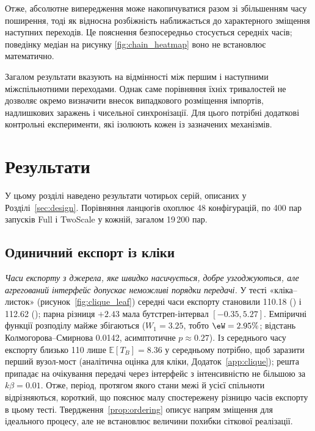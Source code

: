 Отже, абсолютне випередження
може накопичуватися разом
зі збільшенням часу поширення,
тоді як відносна розбіжність
наближається до характерного
зміщення наступних переходів.
Це пояснення безпосередньо
стосується середніх часів;
поведінку медіан на рисунку
\ref{fig:chain_heatmap} воно
не встановлює математично.

Загалом результати вказують
на відмінності між першим
і наступними міжспільнотними
переходами. Однак саме
порівняння їхніх тривалостей
не дозволяє окремо визначити
внесок випадкового розміщення
імпортів, надлишкових
заражень і чисельної
синхронізації.
Для цього потрібні додаткові
контрольні експерименти,
які ізолюють кожен
із зазначених механізмів.







\section{Результати}
\label{sec:results}

У цьому розділі наведено результати чотирьох серій, описаних у Розділі~\ref{sec:design}.
Порівняння ланцюгів охоплює 48 конфігурацій, по 400 пар запусків Full і TwoScale у кожній, загалом 19\,200 пар.

\subsection{Одиничний експорт із кліки}
\label{sec:res_clique}

\emph{Часи експорту з джерела, яке швидко насичується, добре узгоджуються, але агрегований інтерфейс допускає неможливі порядки передачі.} У тесті «кліка--листок» (рисунок~\ref{fig:clique_leaf}) середні часи експорту становили 110.18 (\Full{}) і 112.62 (\TS{}); парна різниця $+2.43$ мала бутстреп-інтервал $[-0.35,5.27]$. Емпіричні функції розподілу майже збігаються ($W_1=3.25$, тобто $\eW=2.95\%$; відстань Колмогорова--Смирнова 0.0142, асимптотичне $p\approx0.27$). Із середнього часу експорту близько 110 лише $\mathbb{E}[T_B]=8.36$ у середньому потрібно, щоб заразити перший вузол-мост (аналітична оцінка для кліки, Додаток~\ref*{app:clique}); решта припадає на очікування передачі через інтерфейс з інтенсивністю не більшою за $k\beta=0.01$. Отже, період, протягом якого стани межі й усієї спільноти відрізняються, короткий, що пояснює малу спостережену різницю часів експорту в цьому тесті. Твердження~\ref{prop:ordering} описує напрям зміщення для ідеального процесу, але не встановлює величини похибки сіткової реалізації.

